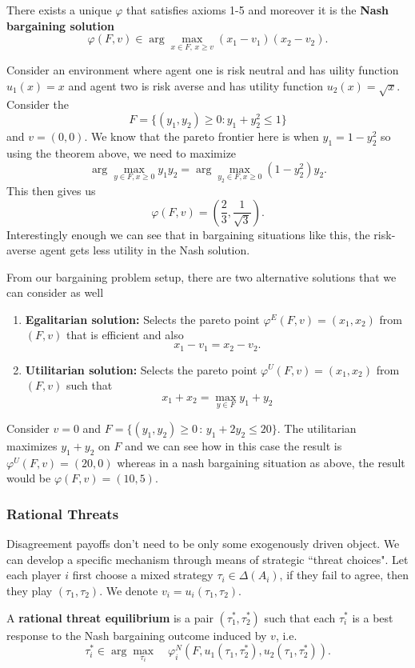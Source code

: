 \documentclass[11pt,english]{article}
\begin{document}
\begin{theorem}
There exists a unique $\varphi$ that satisfies axioms 1-5 and moreover it is the \textbf{Nash bargaining solution} $$\varphi(F, v) \in \arg\max_{x\in F,\,x\geq v}(x_1 - v_1)(x_2 - v_2).$$
\end{theorem}
\begin{example} Consider an environment where agent one is risk neutral and has uility function $u_1(x) = x$ and agent two is risk averse and has utility function $u_2(x) = \sqrt{x}$. Consider the $$F = \{(y_1, y_2)\geq 0:y_1 + y_2^2 \leq 1\}$$ and $v = (0,0)$.  We know that the pareto frontier here is  when $y_1 = 1 - y_2^2$ so using the theorem above, we need to maximize $$\arg\max_{y\in F, x\geq 0} y_1y_2 = \arg\max_{y_2\in F, x\geq 0} (1 - y_2^2)y_2.$$This then gives us $$\varphi(F, v) = \left(\frac{2}{3}, \frac{1}{\sqrt{3}}\right).$$
Interestingly enough we can see that in bargaining situations like this, the risk-averse agent gets less utility in the Nash solution.
\end{example}

From our bargaining problem setup, there are two alternative solutions that we can consider as well
\begin{enumerate}
\item \textbf{Egalitarian solution:} Selects the pareto point $\varphi^E(F,v) = (x_1, x_2)$ from $(F, v)$ that is efficient and also $$x_1 - v_1 = x_2 - v_2.$$
\item \textbf{Utilitarian solution:} Selects the pareto point $\varphi^U(F,v) = (x_1, x_2)$ from $(F,v)$ such that $$x_1 + x_2 = \max_{y\in F}y_1 + y_2$$
\end{enumerate}
\begin{example}
Consider $v = 0$ and $F = \{(y_1, y_2)\geq 0\,:\, y_1 + 2y_2 \leq 20\}$. The utilitarian maximizes $y_1 + y_2$ on $F$ and we can see how in this case the result is $\varphi^U(F,v) = (20, 0)$ whereas in a nash bargaining situation as above, the result would be $\varphi(F,v) = (10, 5)$.
\end{example}

\subsubsection{Rational Threats}
Disagreement payoffs don't need to be only some exogenously driven object. We can develop a specific mechanism through means of strategic ``threat choices". Let each player $i$ first choose a mixed strategy $\tau_i \in \Delta(A_i)$, if they fail to agree, then they play $(\tau_1, \tau_2)$. We denote $v_i = u_i(\tau_1, \tau_2)$. 
\begin{definition}
A \textbf{rational threat equilibrium} is a pair $(\tau_1^*, \tau_2^*)$ such that each $\tau_i^*$ is a best response to the Nash bargaining outcome induced by $v$, i.e. $$\tau_i^*\in \arg\max_{\tau_i}\quad \varphi^N_i\left(F, u_1(\tau_1, \tau_2^*), u_2(\tau_1, \tau_2^*)\right).$$
\end{definition}
\end{document}
